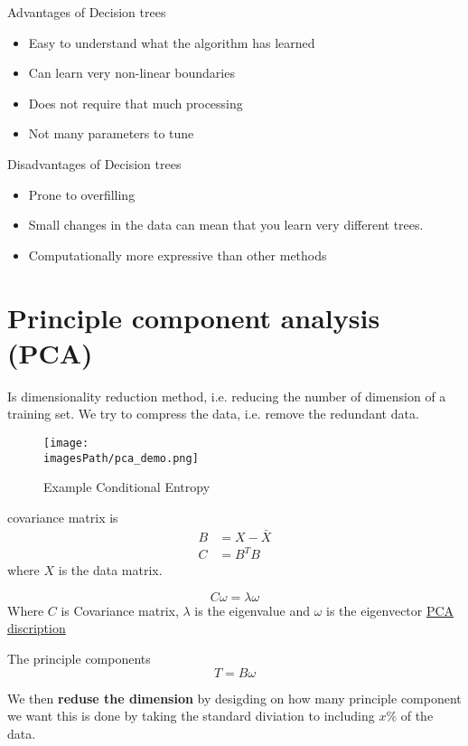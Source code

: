 Advantages of Decision trees
\begin{itemize}
    \item Easy to understand what the algorithm has learned 
    \item Can learn very non-linear boundaries
    \item Does not require that much processing
    \item Not many parameters to tune 
\end{itemize}

Disadvantages of Decision trees
\begin{itemize}
    \item Prone to overfilling 
    \item Small changes in the data can mean that you learn very different trees.
    \item Computationally more expressive than other methods
\end{itemize}

\section{Principle component analysis (PCA)}
Is dimensionality reduction method, i.e. reducing the number of dimension of a training set.
We try to compress the data, i.e. remove the redundant data.
\begin{figure}[!h]
    \centering
    \texttt{[image: \\imagesPath/pca\_demo.png]}
    \caption{Example Conditional Entropy}
    \label{fig:pca_demo}
\end{figure}

covariance matrix is 
\begin{align*}
   B &= X - \bar{X}  \\
   C &= B^TB
\end{align*}
where $X$ is the data matrix.

\begin{equation*}
    C\omega = \lambda\omega
\end{equation*}
Where $C$ is Covariance matrix, $\lambda$ is the eigenvalue and $\omega$ is the eigenvector
\href{https://www.youtube.com/watch?v=fkf4IBRSeEc}{PCA discription}

The principle components 
\begin{equation*}
    T = B\omega
\end{equation*}

We then \textbf{reduse the dimension} by desigding on how many principle component we want
this is done by taking the standard diviation to including $x\%$ of the data.


